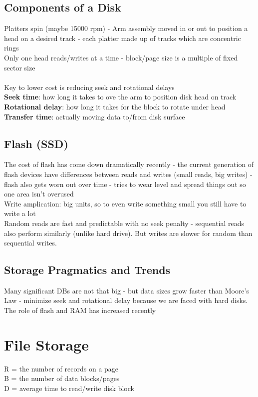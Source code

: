\documentclass{article}
\begin{document}
\subsection{Components of a Disk}
Platters spin (maybe 15000 rpm) - Arm assembly moved in or out to position a head on a desired track - each platter made up of tracks which are concentric rings \\ 
Only one head reads/writes at a time - block/page size is a multiple of fixed sector size \\ \\ 
Key to lower cost is reducing seek and rotational delays \\ 
\textbf{Seek time}: how long it takes to ove the arm to position disk head on track \\ 
\textbf{Rotational delay}: how long it takes for the block to rotate under head \\ 
\textbf{Transfer time}: actually moving data to/from disk surface \\ 
\subsection{Flash (SSD)}
The cost of flash has come down dramatically recently - the current generation of flash devices have differences between reads and writes (small reads, big writes) - flash also gets worn out over time - tries to wear level and spread things out so one area isn't overused \\ 
Write amplication: big units, so to even write something small you still have to write a lot \\ 
Random reads are fast and predictable with no seek penalty - sequential reads also perform similarly (unlike hard drive). But writes are slower for random than sequential writes.
\subsection{Storage Pragmatics and Trends}
Many significant DBs are not that big - but data sizes grow faster than Moore's Law - minimize seek and rotational delay because we are faced with hard disks. The role of flash and RAM has increased recently

\section{File Storage}
R = the number of records on a page \\
B = the number of data blocks/pages \\
D = average time to read/write disk block
\end{document}

